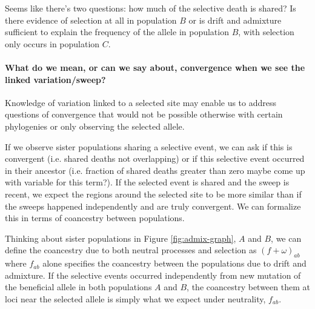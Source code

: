 \documentclass[a4paper,10pt]{article}
\newcommand{\kl}[1]{{\color{orange} #1}}
\begin{document}
Seems like there's two questions: how much of
the selective death is shared? Is there evidence of selection at all
in population $B$ or is drift and admixture sufficient to explain the
frequency of the allele in population $B$, with selection only occurs
in population $C$.

\paragraph{What do we mean, or can we say about, convergence when we see the linked variation/sweep?}
Knowledge of variation linked to a selected site may enable us to address questions of convergence that would not be possible otherwise with certain phylogenies or only observing the selected allele.

If we observe sister populations sharing a selective event, we can ask if this is convergent (i.e. shared deaths not overlapping) or if this selective event occurred in their ancestor (i.e. fraction of shared deaths greater than zero \kl{maybe come up with variable for this term?}). If the selected event is shared and the sweep is recent, we expect the regions around the selected site to be more similar than if the sweeps happened independently and are truly convergent. We can formalize this in terms of coancestry between populations.

Thinking about sister populations in Figure \ref{fig:admix-graph}, $A$ and $B$, we can define the coancestry due to both neutral processes and selection as $(f + \omega)_{ab}$ where $f_{ab}$ alone specifies the coancestry between the populations due to drift and admixture.
If the selective events occurred independently from new mutation of the beneficial allele in both populations $A$ and $B$, the coancestry between them at loci near the selected allele is simply what we expect under neutrality, $f_{ab}$.
\end{document}
